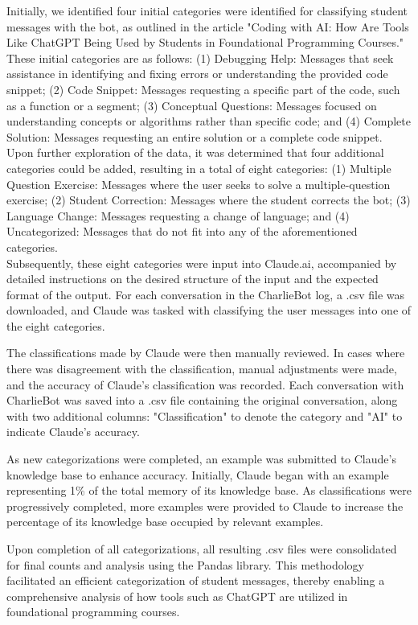 \documentclass[conference]{IEEEtran}
\begin{document}
Initially, we identified four initial categories were identified for classifying
student messages with the bot, as outlined in the article "Coding with AI: How
Are Tools Like ChatGPT Being Used by Students in Foundational Programming
Courses." These initial categories are as follows: (1) Debugging Help: Messages
that seek assistance in identifying and fixing errors or understanding the
provided code snippet; (2) Code Snippet: Messages requesting a specific part
of the code, such as a function or a segment; (3) Conceptual Questions: Messages
focused on understanding concepts or algorithms rather than specific code;
and (4) Complete Solution: Messages requesting an entire solution or a complete
code snippet.
\\
Upon further exploration of the data, it was determined that four additional
categories could be added, resulting in a total of eight categories: (1)
Multiple Question Exercise: Messages where the user seeks to solve a multiple-question
exercise; (2) Student Correction: Messages where the student corrects the bot;
(3) Language Change: Messages requesting a change of language; and (4)
Uncategorized: Messages that do not fit into any of the aforementioned
categories.
\\
Subsequently, these eight categories were input into Claude.ai, accompanied by
detailed instructions on the desired structure of the input and the expected
format of the output. For each conversation in the CharlieBot log, a .csv file
was downloaded, and Claude was tasked with classifying the user messages into
one of the eight categories.

The classifications made by Claude were then manually reviewed. In cases where
there was disagreement with the classification, manual adjustments were made,
and the accuracy of Claude's classification was recorded. Each conversation
with CharlieBot was saved into a .csv file containing the original conversation,
along with two additional columns: "Classification" to denote the category and
"AI" to indicate Claude's accuracy.

As new categorizations were completed, an example was submitted to Claude's
knowledge base to enhance accuracy. Initially, Claude began with an example
representing 1\% of the total memory of its knowledge base. As classifications
were progressively completed, more examples were provided to Claude to increase
the percentage of its knowledge base occupied by relevant examples.

Upon completion of all categorizations, all resulting .csv files were consolidated
for final counts and analysis using the Pandas library. This methodology
facilitated an efficient categorization of student messages, thereby enabling
a comprehensive analysis of how tools such as ChatGPT are utilized in foundational
programming courses.
\end{document}
